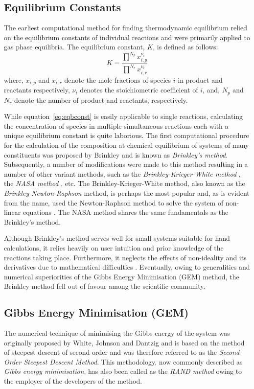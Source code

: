 	\subsection{Equilibrium Constants}
	The earliest computational method for finding thermodynamic equilibrium relied on the equilibrium constants of individual reactions and were primarily applied to gas phase equilibria. The equilibrium constant, $K$, is defined as follows:
	\begin{equation}\label{eq:eqbconst}
		K = \frac{\prod^{N_p} x_{i,p}^{\nu_i}}{\prod^{N_r} x_{i,r}^{\nu_i}}
	\end{equation}
	where, $x_{i,p}$ and $x_{i,r}$ denote the mole fractions of species $i$ in product and reactants respectively, $\nu_i$ denotes the stoichiometric coefficient of $i$, and, $N_p$ and $N_r$ denote the number of product and reactants, respectively.
	
	While equation~\eqref{eq:eqbconst} is easily applicable to single reactions, calculating the concentration of species in multiple simultaneous reactions each with a unique equilibrium constant is quite laborious. The first computational procedure for the calculation of the composition at chemical equilibrium of systems of many constituents was proposed by Brinkley \cite{Brinkley:1947aa} and is known as \emph{Brinkley's method}. Subsequently, a number of modifications were made to this method resulting in a number of other variant methods, such as the \emph{Brinkley-Krieger-White method} \cite{Krieger:1948aa}, the \emph{NASA method} \cite{Zeleznik:1968aa}, etc. The Brinkley-Krieger-White method, also known as the \emph{Brinkley-Newton-Raphson} method, is perhaps the most popular and, as is evident from the name, used the Newton-Raphson method to solve the system of non-linear equations \cite{vanZeggeren11}. The NASA method \cite{Zeleznik:1968aa} shares the same fundamentals as the Brinkley's method.
	
	Although Brinkley's method serves well for small systems suitable for hand calculations, it relies heavily on user intuition and prior knowledge of the reactions taking place. Furthermore, it neglects the effects of non-ideality and its derivatives due to mathematical difficulties \cite{Zeleznik:1968aa}. Eventually, owing to generalities and numerical superiorities of the Gibbs Energy Minimisation (GEM) method, the Brinkley method fell out of favour among the scientific community.
	
	\subsection{Gibbs Energy Minimisation (GEM)}
	The numerical technique of minimising the Gibbs energy of the system was originally proposed by White, Johnson and Dantzig \cite{White:58} and is based on the method of steepest descent of second order and was therefore referred to as the \emph{Second Order Steepest Descent Method}. This methodology, now commonly described as \emph{Gibbs energy minimisation}, has also been called as the \emph{RAND method} owing to the employer of the developers of the method. 
	
